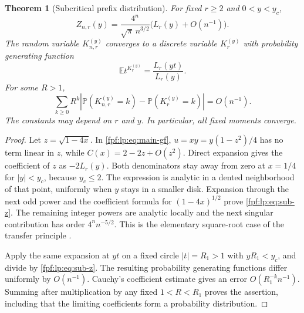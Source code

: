 \documentclass[11pt]{article}
\numberwithin{equation}{section}
\newtheorem{theorem}{Theorem}[section]
\theoremstyle{definition}
\newcommand{\E}{\mathbb E}
\newcommand{\Prob}{\mathbb P}
\begin{document}
\begin{theorem}[Subcritical prefix distribution]\label{fpf:lp:thm:subcritical}
For fixed \(r\ge2\) and \(0<y<y_c\),
\begin{equation}\label{fpf:lp:eq:sub-z}
 Z_{n,r}(y)=\frac{4^n}{\sqrt\pi\,n^{3/2}}
               \bigl(L_r(y)+O(n^{-1})\bigr).
\end{equation}
The random variable \(K_{n,r}^{(y)}\) converges to a discrete variable
\(K_r^{(y)}\) with probability generating function
\begin{equation}\label{fpf:lp:eq:sub-pgf}
 \E t^{K_r^{(y)}}=\frac{L_r(yt)}{L_r(y)}.
\end{equation}
For some \(R>1\),
\[
 \sum_{k\ge0}R^k\left|
 \Prob(K_{n,r}^{(y)}=k)-\Prob(K_r^{(y)}=k)\right|=O(n^{-1}).
\]
The constants may depend on \(r\) and \(y\). In particular, all fixed
moments converge.
\end{theorem}
\begin{proof}
Let \(z=\sqrt{1-4x}\). In \eqref{fpf:lp:eq:main-gf}, \(u=xy=y(1-z^2)/4\)
has no term linear in \(z\), while \(C(x)=2-2z+O(z^2)\). Direct
expansion gives the coefficient of \(z\) as \(-2L_r(y)\). Both
denominators stay away from zero at \(x=1/4\) for \(|y|<y_c\), because
\(y_c\le2\). The expression is analytic in a dented neighborhood of
that point, uniformly when \(y\) stays in a smaller disk. Expansion
through the next odd power and the coefficient formula for
\((1-4x)^{1/2}\) prove \eqref{fpf:lp:eq:sub-z}. The remaining integer
powers are analytic locally and the next singular contribution has order
\(4^nn^{-5/2}\). This is the elementary square-root case of the transfer
principle \cite{fpf-lp-fo}.

Apply the same expansion at \(yt\) on a fixed circle \(|t|=R_1>1\)
with \(yR_1<y_c\), and divide by \eqref{fpf:lp:eq:sub-z}. The resulting
probability generating functions differ uniformly by \(O(n^{-1})\).
Cauchy's coefficient estimate gives an error \(O(R_1^{-k}n^{-1})\).
Summing after multiplication by any fixed \(1<R<R_1\) proves the
assertion, including that the limiting coefficients form a probability
distribution.
\end{proof}
\end{document}
